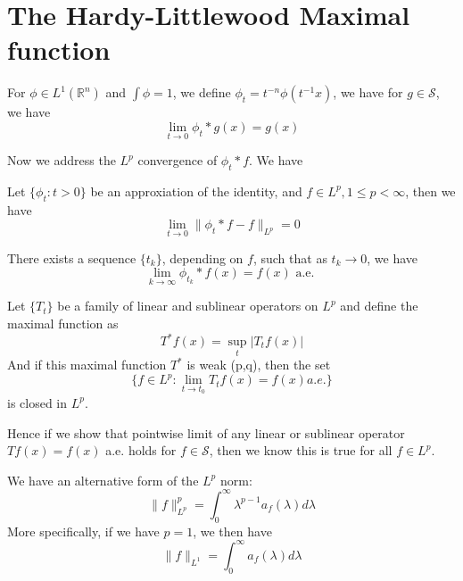\documentclass[lang=en,10pt, color=none]{elegantbook}
\newcommand{\R}{\mathbb{R}}
\begin{document}
\chapter{The Hardy-Littlewood Maximal function}
\begin{proposition}
    For $\phi\in L^1(\R^n)$ and $\int\phi=1$, we define $\phi_t=t^{-n}\phi(t^{-1}x)$, we have for $g\in\mathcal{S}$, we have
    \begin{equation*}
        \lim_{t\to 0}\phi_t\ast g(x)=g(x)
    \end{equation*}
\end{proposition}
Now we address the $L^p$ convergence of $\phi_t\ast f$. We have
\begin{theorem}
    Let $\{\phi_t: t>0\}$ be an approxiation of the identity, and $f\in L^p, 1\leq p<\infty$, then we have
    \begin{equation*}
        \lim_{t\to 0}\|\phi_t\ast f-f\|_{L^p}=0
    \end{equation*}
\end{theorem}
\begin{corollary}
    There exists a sequence $\{t_k\}$, depending on $f$, such that as $t_k\to 0$, we have
    \begin{equation*}
        \lim_{k\to\infty}\phi_{t_k}\ast f(x)=f(x) \text{ a.e. }
    \end{equation*}
\end{corollary}

\begin{theorem}
    Let $\{T_t\}$ be a family of linear and sublinear operators on $L^p$ and define the maximal function as 
    \begin{equation*}
        T^*f(x)=\sup_t|T_tf(x)|
    \end{equation*}
    And if this maximal function $T^*$ is weak (p,q), then the set
    \begin{equation*}
        \{f\in L^p: \lim_{t\to t_0}T_tf(x)=f(x)a.e. \}
    \end{equation*}
    is closed in $L^p$.
\end{theorem}
Hence if we show that pointwise limit of any linear or sublinear operator $Tf(x)=f(x)$ a.e. holds for $f\in\mathcal{S}$, then we know this is true for all $f\in L^p$.

\begin{proposition}
    We have an alternative form of the $L^p$ norm:
    \begin{equation*}
        \|f\|_{L^p}^p=\int_0^\infty\lambda^{p-1}a_f(\lambda)d\lambda
    \end{equation*}
    More specifically, if we have $p=1$, we then have
    \begin{equation*}
        \|f\|_{L^1}=\int_0^\infty a_f(\lambda)d\lambda
    \end{equation*}
\end{proposition}
\end{document}
